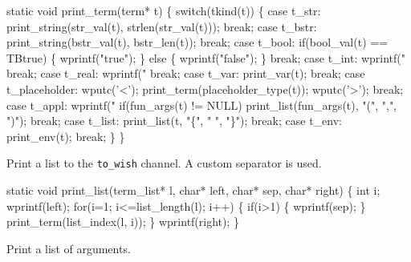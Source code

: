 \nwenddocs{}\endmoddef\let\nwnotused=\nwoutput{}\nwstartdeflinemarkup{}\nwenddeflinemarkup
static void print_term(term* t)
\{
   switch(tkind(t))
   \{
      case t_str:
         print_string(str_val(t), strlen(str_val(t)));
         break;
      case t_bstr:
         print_string(bstr_val(t), bstr_len(t));
         break;
      case t_bool:
         if(bool_val(t) == TBtrue) \{
            wprintf("true");
         \} else \{
            wprintf("false");
         \}
         break;
      case t_int:
         wprintf("%
         break;
      case t_real:
         wprintf("%
         break;
      case t_var:
         print_var(t);
         break;
      case t_placeholder:
         wputc('<');
         print_term(placeholder_type(t));
         wputc('>');
         break;
      case t_appl:
         wprintf("%
         if(fun_args(t) != NULL)
            print_list(fun_args(t), "(", ",", ")");
         break;
      case t_list:
         print_list(t, "\{", " ", "\}");
         break;
      case t_env:
         print_env(t);
         break;
   \}
\}
\nwendcode{}\nwdocspar


Print a list to the {\tt to\_wish} channel. A custom separator is used.

\nwenddocs{}\endmoddef\let\nwnotused=\nwoutput{}\nwstartdeflinemarkup{}\nwenddeflinemarkup
static void print_list(term_list* l, char* left, char* sep, char* right)
\{
   int i;
   wprintf(left);
   for(i=1; i<=list_length(l); i++) \{
      if(i>1) \{
         wprintf(sep);
      \}
      print_term(list_index(l, i));
   \}
   wprintf(right);
\}
\nwendcode{}\nwdocspar


Print a list of arguments.

